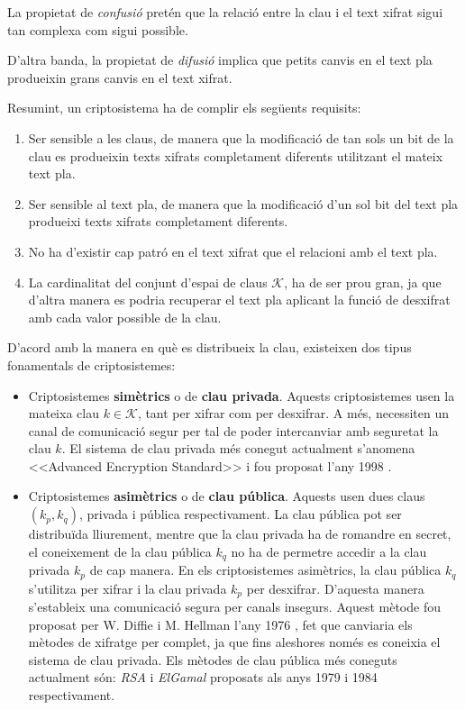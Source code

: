 \documentclass[11pt,a4paper,openright,oneside]{article}
\numberwithin{equation}{section}
\theoremstyle{definition}
\begin{document}
La propietat de \textit{confusió} pretén que la relació entre la clau i el text xifrat sigui tan complexa com sigui possible.

D'altra banda, la propietat de \textit{difusió} implica que petits canvis en el text pla produeixin grans canvis en el text xifrat.

Resumint, un criptosistema ha de complir els següents requisits: 

\begin{enumerate}
    \item Ser sensible a les claus, de manera que la modificació de tan sols un bit de la clau es produeixin texts xifrats completament diferents utilitzant el mateix text pla. 
    
    \item Ser sensible al text pla, de manera que la modificació d'un sol bit del text pla produeixi texts xifrats completament diferents.
    
    \item No ha d'existir cap patró en el text xifrat que el relacioni amb el text pla.
    
    \item La cardinalitat del conjunt d'espai de claus $\mathcal{K}$, ha de ser prou gran, ja que d'altra manera es podria recuperar el text pla aplicant la funció de desxifrat amb cada valor possible de la clau. 
\end{enumerate}

D'acord amb la manera en què es distribueix la clau, existeixen dos tipus fonamentals de criptosistemes:

\begin{itemize}
    \item Criptosistemes \textbf{simètrics} o de \textbf{clau privada}. Aquests criptosistemes usen la mateixa clau $k\in \mathcal{K}$, tant per xifrar com per desxifrar. A més, necessiten un canal de comunicació segur per tal de poder intercanviar amb seguretat la clau $k$. El sistema de clau privada més conegut actualment s'anomena <<Advanced Encryption Standard>> i fou proposat l'any 1998 \cite{AES}.
    
    \item Criptosistemes \textbf{asimètrics} o de \textbf{clau pública}. Aquests usen dues claus $(k_p,k_q)$, privada i pública respectivament. La clau pública pot ser distribuïda lliurement, mentre que la clau privada ha de romandre en secret, el coneixement de la clau pública $k_q$ no ha de permetre accedir a la clau privada $k_p$ de cap manera. En els criptosistemes asimètrics, la clau pública $k_q$ s'utilitza per xifrar i la clau privada $k_p$ per desxifrar. D'aquesta manera s'estableix una comunicació segura per canals insegurs. Aquest mètode fou proposat per W. Diffie i M. Hellman l'any 1976 \cite{Hellmann}, fet que canviaria els mètodes de xifratge per complet, ja que fins aleshores només es coneixia el sistema de clau privada. Els mètodes de clau pública més coneguts actualment són: \textit{RSA} \cite{RSA} i \textit{ElGamal} \cite{ElGamal} proposats als anys 1979 i 1984 respectivament.
\end{itemize}
\end{document}
